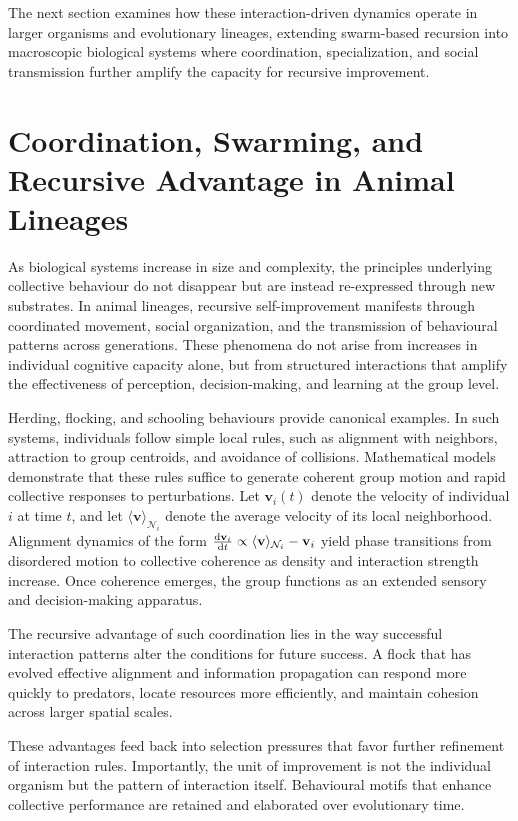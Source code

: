 \documentclass[11pt]{article}
\begin{document}
The next section examines how these interaction-driven dynamics operate in larger organisms and evolutionary lineages, extending swarm-based recursion into macroscopic biological systems where coordination, specialization, and social transmission further amplify the capacity for recursive improvement. 

\section{Coordination, Swarming, and Recursive Advantage in Animal Lineages}

As biological systems increase in size and complexity, the principles underlying collective behaviour do not disappear but are instead re-expressed through new substrates. In animal lineages, recursive self-improvement manifests through coordinated movement, social organization, and the transmission of behavioural patterns across generations. These phenomena do not arise from increases in individual cognitive capacity alone, but from structured interactions that amplify the effectiveness of perception, decision-making, and learning at the group level.

Herding, flocking, and schooling behaviours provide canonical examples. In such systems, individuals follow simple local rules, such as alignment with neighbors, attraction to group centroids, and avoidance of collisions. Mathematical models demonstrate that these rules suffice to generate coherent group motion and rapid collective responses to perturbations. Let $\mathbf{v}_i(t)$ denote the velocity of individual $i$ at time $t$, and let $\langle \mathbf{v} \rangle_{\mathcal{N}_i}$ denote the average velocity of its local neighborhood. Alignment dynamics of the form $\dv{\mathbf{v}_i}{t} \propto \langle \mathbf{v} \rangle_{\mathcal{N}_i} - \mathbf{v}_i$ yield phase transitions from disordered motion to collective coherence as density and interaction strength increase. Once coherence emerges, the group functions as an extended sensory and decision-making apparatus.

The recursive advantage of such coordination lies in the way successful interaction patterns alter the conditions for future success. A flock that has evolved effective alignment and information propagation can respond more quickly to predators, locate resources more efficiently, and maintain cohesion across larger spatial scales. 

These advantages feed back into selection pressures that favor further refinement of interaction rules. Importantly, the unit of improvement is not the individual organism but the pattern of interaction itself. Behavioural motifs that enhance collective performance are retained and elaborated over evolutionary time.
\end{document}
